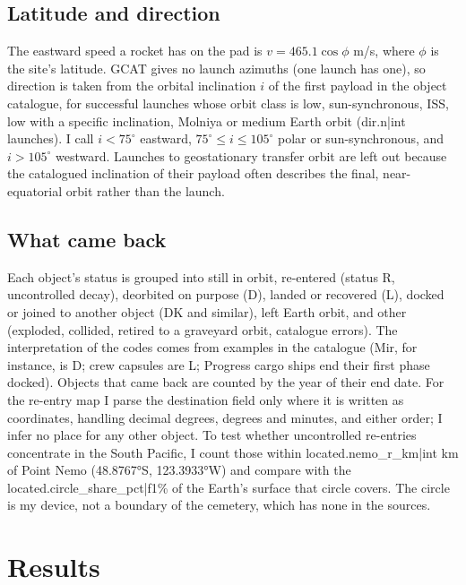 \documentclass[11pt,a4paper]{article}
\begin{document}
\subsection{Latitude and direction}
The eastward speed a rocket has on the pad is $v = 465.1\cos\phi$ m/s, where $\phi$ is the site's latitude. GCAT gives no launch azimuths (one launch has one), so direction is taken from the orbital inclination $i$ of the first payload in the object catalogue, for successful launches whose orbit class is low, sun-synchronous, ISS, low with a specific inclination, Molniya or medium Earth orbit ({{dir.n|int}} launches). I call $i < 75^\circ$ eastward, $75^\circ \le i \le 105^\circ$ polar or sun-synchronous, and $i > 105^\circ$ westward. Launches to geostationary transfer orbit are left out because the catalogued inclination of their payload often describes the final, near-equatorial orbit rather than the launch.

\subsection{What came back}
Each object's status is grouped into still in orbit, re-entered (status R, uncontrolled decay), deorbited on purpose (D), landed or recovered (L), docked or joined to another object (DK and similar), left Earth orbit, and other (exploded, collided, retired to a graveyard orbit, catalogue errors). The interpretation of the codes comes from examples in the catalogue (Mir, for instance, is D; crew capsules are L; Progress cargo ships end their first phase docked). Objects that came back are counted by the year of their end date. For the re-entry map I parse the destination field only where it is written as coordinates, handling decimal degrees, degrees and minutes, and either order; I infer no place for any other object. To test whether uncontrolled re-entries concentrate in the South Pacific, I count those within {{located.nemo_r_km|int}} km of Point Nemo (48.8767°S, 123.3933°W) and compare with the {{located.circle_share_pct|f1}}\% of the Earth's surface that circle covers. The circle is my device, not a boundary of the cemetery, which has none in the sources.

\section{Results}
\end{document}
